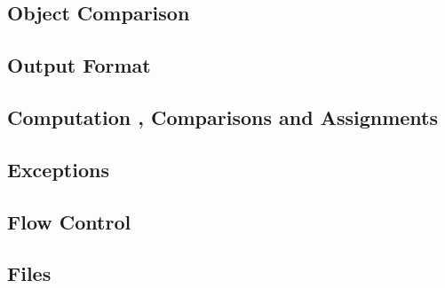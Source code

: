 
\subsection{Object Comparison}
\subsection{Output Format}
\subsection{Computation , Comparisons and Assignments}
\subsection{Exceptions}
\subsection{Flow Control}
\subsection{Files}



